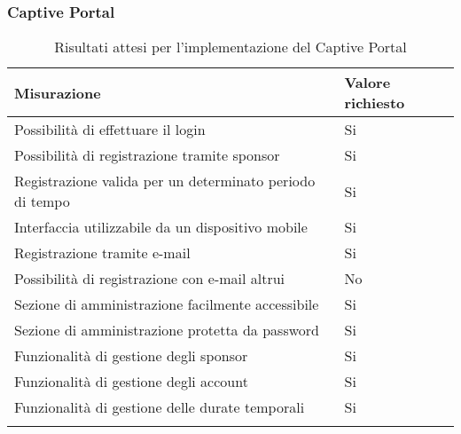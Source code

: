 \documentclass[Tesi.tex]{subfiles}
\begin{document}
\newpage
\subsubsection{Captive Portal}
\label{table:Risultati attesi per l'implementazione del Captive Portal}
\renewcommand*{\arraystretch}{1.2}
\begin{longtable}[H]{p{9.5cm}p{3.4cm}}
	\rowcolor{CHeader}
	\color{CHeaderText} \textbf{Misurazione} & \color{CHeaderText} \textbf{Valore richiesto} \\
	\endhead
	Possibilità di effettuare il login &
	Si \\
	Possibilità di registrazione tramite sponsor &
	Si \\
	Registrazione valida per un determinato periodo di tempo &
	Si \\
	Interfaccia utilizzabile da un dispositivo mobile &
	Si \\
	Registrazione tramite e-mail &
	Si \\
	Possibilità di registrazione con e-mail altrui &
	No \\
	Sezione di amministrazione facilmente accessibile &
	Si \\
	Sezione di amministrazione protetta da password &
	Si \\
	Funzionalità di gestione degli sponsor &
	Si \\
	Funzionalità di gestione degli account &
	Si \\
	Funzionalità di gestione delle durate temporali &
	Si \\
	
	\hiderowcolors
	\caption{Risultati attesi per l'implementazione del Captive Portal}
\end{longtable}
\end{document}
